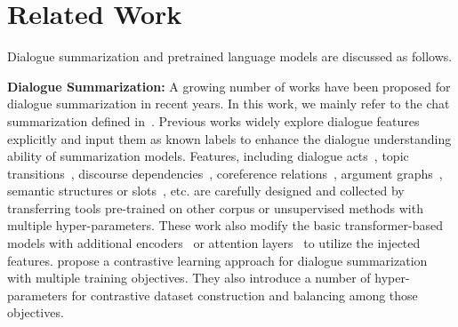 \section{Related Work}
\label{sec:relatedwork}
Dialogue summarization and pretrained language models are discussed as follows.


\textbf{Dialogue Summarization:} A growing number of works have been proposed for dialogue summarization in recent years. 
In this work, we mainly refer to the chat summarization defined in~\cite{feng2021survey}.
Previous works widely explore dialogue features explicitly and input them as known labels to enhance the dialogue understanding ability of summarization models.
Features, including dialogue acts~\cite{goo2018abstractive}, topic transitions~\cite{chen2020multi}, discourse dependencies~\cite{chen2021structure}, coreference relations~\cite{liu2021coreference}, argument graphs~\cite{fabbri2021convosumm}, semantic structures or slots~\cite{lei-etal-2021-finer-grain,zhao-etal-2021-give-truth}, etc. are carefully designed and collected by transferring tools pre-trained on other corpus or unsupervised methods with multiple hyper-parameters. 
These work also modify the basic transformer-based models with additional encoders~\cite{chen2020multi} or attention layers~\cite{chen2021structure,liu2021coreference,lei-etal-2021-finer-grain,zhao-etal-2021-give-truth} to utilize the injected features.
\citet{liu-etal-2021-topic-aware} propose a contrastive learning approach for dialogue summarization with multiple training objectives. They also introduce a number of hyper-parameters for contrastive dataset construction and balancing among those objectives.



